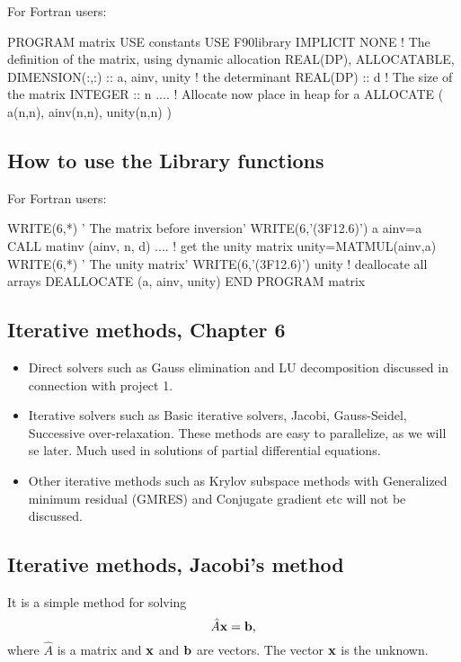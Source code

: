 \documentclass[%
twoside,                 %
final,                   %
10pt]{article}
\begin{document}
{{{{{{{For Fortran users:

\bfcod
PROGRAM matrix
  USE constants
  USE F90library
  IMPLICIT NONE
  !      The definition of the matrix, using dynamic allocation
  REAL(DP), ALLOCATABLE, DIMENSION(:,:) :: a, ainv, unity
  !      the determinant
  REAL(DP) :: d
  !      The size of the matrix
  INTEGER :: n
  ....
  !      Allocate now place in heap for a
  ALLOCATE ( a(n,n), ainv(n,n), unity(n,n) )
\efcod

\subsection{How to use the Library functions}

For Fortran users:

\bfcod
  WRITE(6,*) ' The matrix before inversion'
  WRITE(6,'(3F12.6)') a
  ainv=a
  CALL matinv (ainv, n, d)
  ....
  !      get the unity matrix
  unity=MATMUL(ainv,a)
  WRITE(6,*) ' The unity matrix'
  WRITE(6,'(3F12.6)') unity
  !      deallocate all arrays
  DEALLOCATE (a, ainv, unity)
END PROGRAM matrix

\efcod




\subsection{Iterative methods, Chapter 6}
\begin{block}{}
\begin{itemize}
 \item Direct solvers such as Gauss elimination and  LU decomposition discussed in connection with project 1.

 \item Iterative solvers such as Basic iterative solvers,  Jacobi,  Gauss-Seidel, Successive over-relaxation. These methods are easy to parallelize, as we will se later. Much used in solutions of partial differential equations.

 \item Other iterative methods such as Krylov subspace methods with Generalized minimum residual (GMRES) and Conjugate gradient etc will not be discussed.
\end{itemize}

\noindent
\end{block}


\subsection{Iterative methods, Jacobi's method}
\begin{block}{}
It is a simple method for solving
\[ 
\hat{A}{\bf x}={\bf b},
\]
where $\hat{A}$ is a matrix and ${\bf x}$ and ${\bf b}$ are vectors. The vector ${\bf x}$ is 
the unknown.


\end{block}}}}}}}}
\end{document}
